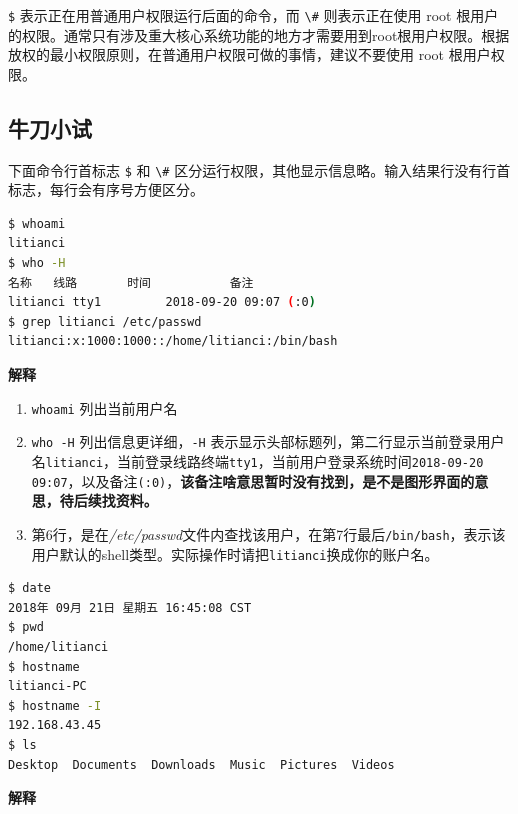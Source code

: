 \documentclass[doctor,openright,twoside]{sjtuthesis}
\providecommand{\tightlist}{%
    \setlength{\itemsep}{0pt}\setlength{\parskip}{0pt}}
\newcommand{\passthrough}[1]{#1}
\theoremstyle{plain}
\theoremstyle{definition}
\theoremstyle{remark}
\theoremstyle{ocrenumbox}
\theoremstyle{plain}
\begin{document}
\passthrough{\lstinline!$!} 表示正在用普通用户权限运行后面的命令，而 \passthrough{\lstinline!\#!} 则表示正在使用 root 根用户的权限。通常只有涉及重大核心系统功能的地方才需要用到root根用户权限。根据放权的最小权限原则，在普通用户权限可做的事情，建议不要使用 root 根用户权限。

\hypertarget{section-40}{%
\subsection{牛刀小试}\label{section-40}}

下面命令行首标志 \passthrough{\lstinline!$!} 和 \passthrough{\lstinline!\#!} 区分运行权限，其他显示信息略。输入结果行没有行首标志，每行会有序号方便区分。

\begin{lstlisting}[language=bash]
$ whoami
litianci
$ who -H
名称   线路       时间           备注
litianci tty1         2018-09-20 09:07 (:0)
$ grep litianci /etc/passwd
litianci:x:1000:1000::/home/litianci:/bin/bash
\end{lstlisting}

\textbf{解释}

\begin{enumerate}
\def\labelenumi{\arabic{enumi}.}
\tightlist
\item
  \passthrough{\lstinline!whoami!} 列出当前用户名
\item
  \passthrough{\lstinline!who -H!} 列出信息更详细，\passthrough{\lstinline!-H!} 表示显示头部标题列，第二行显示当前登录用户名\passthrough{\lstinline!litianci!}，当前登录线路终端\passthrough{\lstinline!tty1!}，当前用户登录系统时间\passthrough{\lstinline!2018-09-20 09:07!}，以及备注\passthrough{\lstinline!(:0)!}，\textbf{该备注啥意思暂时没有找到，是不是图形界面的意思，待后续找资料。}
\item
  第6行，是在\emph{/etc/passwd}文件内查找该用户，在第7行最后\passthrough{\lstinline!/bin/bash!}，表示该用户默认的shell类型。实际操作时请把\passthrough{\lstinline!litianci!}换成你的账户名。
\end{enumerate}

\begin{lstlisting}[language=bash]
$ date
2018年 09月 21日 星期五 16:45:08 CST
$ pwd
/home/litianci
$ hostname
litianci-PC
$ hostname -I
192.168.43.45
$ ls
Desktop  Documents  Downloads  Music  Pictures  Videos
\end{lstlisting}

\textbf{解释}
\end{document}
